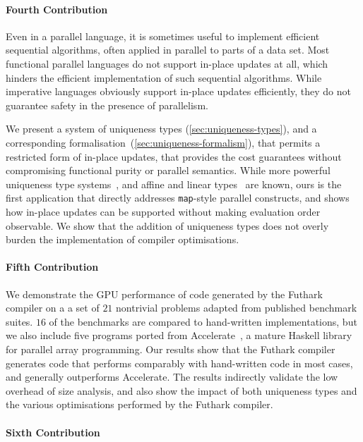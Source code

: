 \paragraph{Fourth Contribution}

Even in a parallel language, it is sometimes useful to implement
efficient sequential algorithms, often applied in parallel to parts of
a data set.  Most functional parallel languages do not support
in-place updates at all, which hinders the efficient implementation of
such sequential algorithms.  While imperative languages obviously
support in-place updates efficiently, they do not guarantee safety in
the presence of parallelism.

We present a system of uniqueness types (\cref{sec:uniqueness-types}),
and a corresponding formalisation~(\cref{sec:uniqueness-formalism}),
that permits a restricted form of in-place updates, that provides the
cost guarantees without compromising functional purity or parallel
semantics.  While more powerful uniqueness type
systems~\cite{clean-uniqueness-types}, and affine and linear
types~\cite{Tov:2011:PAT:1926385.1926436,Fahndrich:2002:AFP:543552.512532}
are known, ours is the first application that directly addresses
\texttt{map}-style parallel constructs, and shows how in-place updates
can be supported without making evaluation order observable.  We show
that the addition of uniqueness types does not overly burden the
implementation of compiler optimisations.

\paragraph{Fifth Contribution}

We demonstrate the GPU performance of code generated by the Futhark
compiler on a a set of $21$ nontrivial problems adapted from published
benchmark suites.  $16$ of the benchmarks are compared to hand-written
implementations, but we also include five programs ported from
Accelerate~\cite{mcdonell2013optimising}, a mature Haskell library for
parallel array programming. Our results show that the Futhark compiler
generates code that performs comparably with hand-written code in most
cases, and generally outperforms Accelerate.  The results indirectly
validate the low overhead of size analysis, and also show the impact
of both uniqueness types and the various optimisations performed by
the Futhark compiler.

\paragraph{Sixth Contribution}


